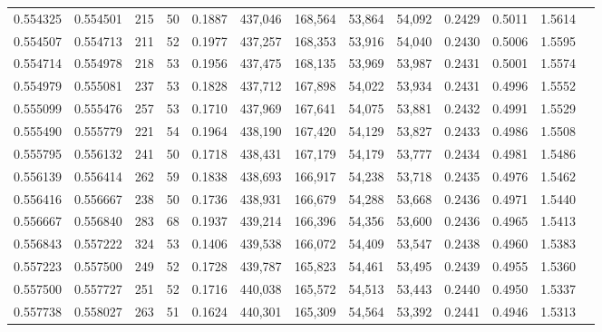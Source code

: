 \begin{tabular}{rrrrrrrrrrrrr}
0.554325 & 0.554501 &    215 &    50 &                                     0.1887 & 437,046 & 168,564 &  53,864 &  54,092 & 0.2429 & 0.5011 & 1.5614 \\
0.554507 & 0.554713 &    211 &    52 &                                     0.1977 & 437,257 & 168,353 &  53,916 &  54,040 & 0.2430 & 0.5006 & 1.5595 \\
0.554714 & 0.554978 &    218 &    53 &                                     0.1956 & 437,475 & 168,135 &  53,969 &  53,987 & 0.2431 & 0.5001 & 1.5574 \\
0.554979 & 0.555081 &    237 &    53 &                                     0.1828 & 437,712 & 167,898 &  54,022 &  53,934 & 0.2431 & 0.4996 & 1.5552 \\
0.555099 & 0.555476 &    257 &    53 &                                     0.1710 & 437,969 & 167,641 &  54,075 &  53,881 & 0.2432 & 0.4991 & 1.5529 \\
0.555490 & 0.555779 &    221 &    54 &                                     0.1964 & 438,190 & 167,420 &  54,129 &  53,827 & 0.2433 & 0.4986 & 1.5508 \\
0.555795 & 0.556132 &    241 &    50 &                                     0.1718 & 438,431 & 167,179 &  54,179 &  53,777 & 0.2434 & 0.4981 & 1.5486 \\
0.556139 & 0.556414 &    262 &    59 &                                     0.1838 & 438,693 & 166,917 &  54,238 &  53,718 & 0.2435 & 0.4976 & 1.5462 \\
0.556416 & 0.556667 &    238 &    50 &                                     0.1736 & 438,931 & 166,679 &  54,288 &  53,668 & 0.2436 & 0.4971 & 1.5440 \\
0.556667 & 0.556840 &    283 &    68 &                                     0.1937 & 439,214 & 166,396 &  54,356 &  53,600 & 0.2436 & 0.4965 & 1.5413 \\
0.556843 & 0.557222 &    324 &    53 &                                     0.1406 & 439,538 & 166,072 &  54,409 &  53,547 & 0.2438 & 0.4960 & 1.5383 \\
0.557223 & 0.557500 &    249 &    52 &                                     0.1728 & 439,787 & 165,823 &  54,461 &  53,495 & 0.2439 & 0.4955 & 1.5360 \\
0.557500 & 0.557727 &    251 &    52 &                                     0.1716 & 440,038 & 165,572 &  54,513 &  53,443 & 0.2440 & 0.4950 & 1.5337 \\
0.557738 & 0.558027 &    263 &    51 &                                     0.1624 & 440,301 & 165,309 &  54,564 &  53,392 & 0.2441 & 0.4946 & 1.5313 \\

\end{tabular}
